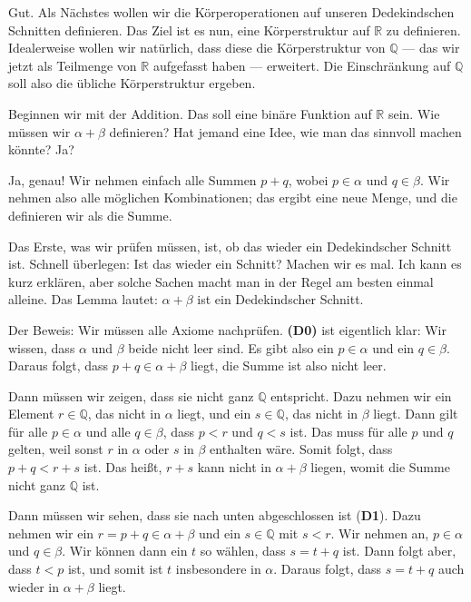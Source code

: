 \begin{spoken-clean}[00:37:08 - 00:39:28]
Gut. Als Nächstes wollen wir die Körperoperationen auf unseren Dedekindschen Schnitten definieren. Das Ziel ist es nun, eine Körperstruktur auf $\mathbb{R}$ zu definieren. Idealerweise wollen wir natürlich, dass diese die Körperstruktur von $\mathbb{Q}$ --- das wir jetzt als Teilmenge von $\mathbb{R}$ aufgefasst haben --- erweitert. Die Einschränkung auf $\mathbb{Q}$ soll also die übliche Körperstruktur ergeben.

Beginnen wir mit der Addition. Das soll eine binäre Funktion auf $\mathbb{R}$ sein. Wie müssen wir $\alpha + \beta$ definieren? Hat jemand eine Idee, wie man das sinnvoll machen könnte? Ja?


Ja, genau! Wir nehmen einfach alle Summen $p + q$, wobei $p \in \alpha$ und $q \in \beta$. Wir nehmen also alle möglichen Kombinationen; das ergibt eine neue Menge, und die definieren wir als die Summe.

Das Erste, was wir prüfen müssen, ist, ob das wieder ein Dedekindscher Schnitt ist. Schnell überlegen: Ist das wieder ein Schnitt? Machen wir es mal. Ich kann es kurz erklären, aber solche Sachen macht man in der Regel am besten einmal alleine. Das Lemma lautet: $\alpha + \beta$ ist ein Dedekindscher Schnitt.
\end{spoken-clean}

\begin{spoken-clean}[00:39:28 - 00:40:51]
Der Beweis: Wir müssen alle Axiome nachprüfen. \textbf{(D0)} ist eigentlich klar: Wir wissen, dass $\alpha$ und $\beta$ beide nicht leer sind. Es gibt also ein $p \in \alpha$ und ein $q \in \beta$. Daraus folgt, dass $p + q \in \alpha + \beta$ liegt, die Summe ist also nicht leer.

Dann müssen wir zeigen, dass sie nicht ganz $\mathbb{Q}$ entspricht. Dazu nehmen wir ein Element $r \in \mathbb{Q}$, das nicht in $\alpha$ liegt, und ein $s \in \mathbb{Q}$, das nicht in $\beta$ liegt. Dann gilt für alle $p \in \alpha$ und alle $q \in \beta$, dass $p < r$ und $q < s$ ist. Das muss für alle $p$ und $q$ gelten, weil sonst $r$ in $\alpha$ oder $s$ in $\beta$ enthalten wäre. Somit folgt, dass $p + q < r + s$ ist. Das heißt, $r + s$ kann nicht in $\alpha + \beta$ liegen, womit die Summe nicht ganz $\mathbb{Q}$ ist.

Dann müssen wir sehen, dass sie nach unten abgeschlossen ist (\textbf{D1}). Dazu nehmen wir ein $r = p + q \in \alpha + \beta$ und ein $s \in \mathbb{Q}$ mit $s < r$. Wir nehmen an, $p \in \alpha$ und $q \in \beta$. Wir können dann ein $t$ so wählen, dass $s = t + q$ ist. Dann folgt aber, dass $t < p$ ist, und somit ist $t$ insbesondere in $\alpha$. Daraus folgt, dass $s = t + q$ auch wieder in $\alpha + \beta$ liegt.
\end{spoken-clean}

